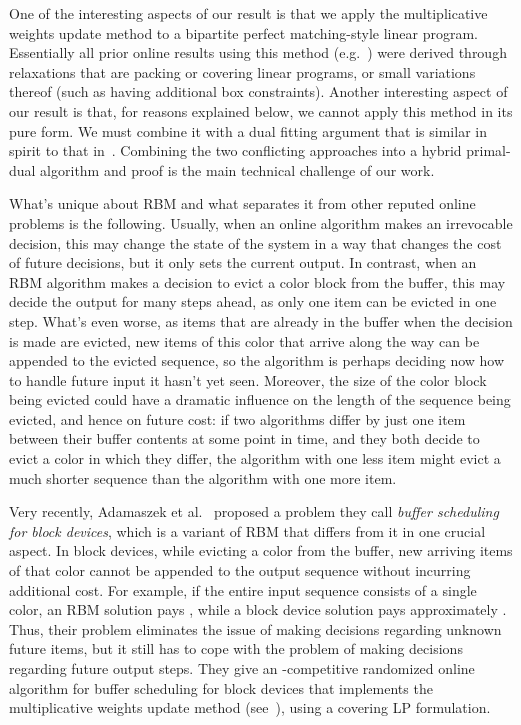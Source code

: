 \documentclass[12pt]{article}
\begin{document}
One of the interesting aspects of our result is that we apply the 
multiplicative weights update method to a bipartite perfect matching-style 
linear program. Essentially all prior online results 
using this method (e.g.~\cite{AAABN09,BBN12,BBMN11,ACER12}) 
were derived through relaxations that are packing 
or covering linear programs, or small variations thereof (such as 
having additional box constraints). Another interesting aspect of 
our result is that, for reasons explained below, we cannot apply this 
method in its pure form. We must combine it with a dual fitting argument 
that is similar in spirit to that in~\cite{AR10}. Combining the two
conflicting approaches into a hybrid primal-dual algorithm and
proof is the main technical challenge of our work.

What's unique about RBM and what separates it from other reputed
online problems is the following. Usually, when an online algorithm 
makes an irrevocable decision, this may change the state of the system
in a way that changes the cost of future decisions, but it only sets
the current output. In contrast, when an RBM algorithm makes a
decision to evict a color block from the buffer, this may decide the 
output for many steps ahead, as only one item can be evicted in one
step. What's even worse, as items that are already in the buffer when
the decision is made are evicted, new items of this color that arrive
along the way can be appended to the evicted sequence, so the algorithm
is perhaps deciding now how to handle future input it hasn't yet seen.
Moreover, the size of the color block being evicted could have a dramatic
influence on the length of the sequence being evicted, and hence on
future cost: if two algorithms differ by just one item between their buffer 
contents at some point in time, and they both decide to evict a color in 
which they differ, the algorithm with one less item might evict a much 
shorter sequence than the algorithm with one more item.

Very recently, Adamaszek et al.~\cite{ACER12} proposed a 
problem they call {\em buffer scheduling for block devices},
which is a variant of RBM that differs from it in one crucial
aspect. In block devices, while evicting a color from the buffer, 
new arriving items of that color cannot be appended to the 
output sequence without incurring additional cost. For example,
if the entire input sequence consists of a single color, an RBM 
solution pays , while a block device solution pays 
approximately . Thus, their problem eliminates 
the issue of making decisions regarding unknown future items, 
but it still has to cope with the problem of making decisions 
regarding future output steps. 
They give an -competitive
randomized online algorithm for buffer scheduling for
block devices that implements the multiplicative weights
update method (see~\cite{BN09}), using a covering LP formulation.
\end{document}
